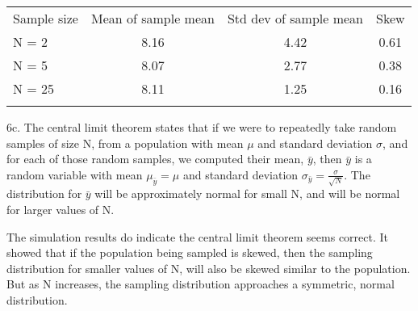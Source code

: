 \documentclass{article}
\begin{document}
\begin{longtable}[c]{@{}lccc@{}}
\toprule\addlinespace
Sample size & Mean of sample mean & Std dev of sample mean & Skew
\\\addlinespace
\midrule\endhead
N = 2 & 8.16 & 4.42 & 0.61
\\\addlinespace
N = 5 & 8.07 & 2.77 & 0.38
\\\addlinespace
N = 25 & 8.11 & 1.25 & 0.16
\\\addlinespace
\bottomrule
\end{longtable}

    6c. The central limit theorem states that if we were to repeatedly take
random samples of size N, from a population with mean $\mu$ and standard
deviation $\sigma$, and for each of those random samples, we computed
their mean, $\bar{y}$, then $\bar{y}$ is a random variable with mean
$\mu_{\bar{y}} = \mu$ and standard deviation
$\sigma_{\bar{y}} = \frac{\sigma}{\sqrt{N}}$. The distribution for $\bar{y}$
will be approximately normal for small N, and will be normal for larger
values of N.

The simulation results do indicate the central limit theorem seems
correct. It showed that if the population being sampled is skewed, then
the sampling distribution for smaller values of N, will also be skewed
similar to the population. But as N increases, the sampling distribution
approaches a symmetric, normal distribution.


    
    
    
    
\end{document}
